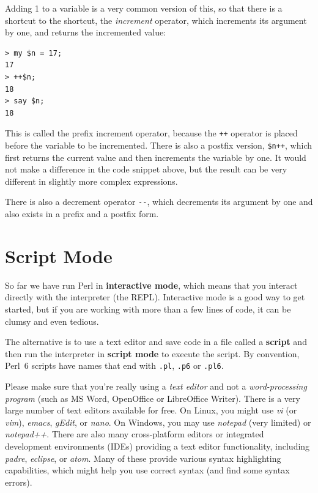 Adding 1 to a variable is a very common version of this, so that 
there is a shortcut to the shortcut, the \emph{increment} operator, 
which increments its argument by one, and returns the incremented value:

\begin{verbatim}
> my $n = 17;
17
> ++$n;
18
> say $n;
18
\end{verbatim}
%
This is called the prefix increment operator, because the \verb"++" 
operator is placed before the variable to be incremented. There is 
also a postfix version, \verb"$n++", which first returns the current 
value and then increments the variable by one. It would not make 
a difference in the code snippet above, but the result can be very different 
in slightly more complex expressions. 

There is also a decrement operator \verb"--", which decrements its 
argument by one and also exists in a prefix and a postfix form. 



\section{Script Mode}

So far we have run Perl in {\bf interactive mode}, which
means that you interact directly with the interpreter (the 
REPL). Interactive mode is a good way to get started,
but if you are working with more than a few lines of code, 
it can be clumsy and even tedious.

The alternative is to use a text editor and save code in a file 
called a {\bf script} and then run the interpreter in {\bf script mode} 
to execute the script.  By convention, Perl~6 scripts have names that 
end with {\tt .pl}, {\tt .p6} or {\tt .pl6}.

Please make sure that you're really using a \emph{text editor} 
and not a \emph{word-processing program} (such as MS Word, 
OpenOffice or LibreOffice Writer). There is a very large 
number of text editors available for free. On Linux, you might use 
\emph{vi} (or \emph{vim}), \emph{emacs}, \emph{gEdit}, or 
\emph{nano}. On Windows, you may use \emph{notepad} (very limited) 
or \emph{notepad++}. There are also many cross-platform editors  
or integrated development environments (IDEs) providing a 
text editor functionality, including \emph{padre}, \emph{eclipse}, 
or \emph{atom}. Many of these provide various syntax highlighting 
capabilities, which might help you use correct syntax (and 
find some syntax errors).

